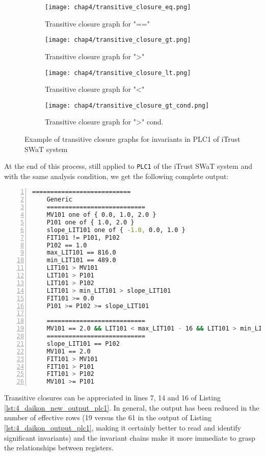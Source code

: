 \begin{figure}[H]
	\centering
	\begin{subfigure}{0.48\textwidth}
		\texttt{[image: chap4/transitive\_closure\_eq.png]}
		\caption{Transitive closure graph for "=="}
		\label{subfig:4_graph_eq}
	\end{subfigure}
	\hfill
	\begin{subfigure}{0.48\textwidth}
		\texttt{[image: chap4/transitive\_closure\_gt.png]}
		\caption{Transitive closure graph for ">"}
		\label{subfig:4_graph_gt}
	\end{subfigure}
	\begin{subfigure}{0.48\textwidth}
		\texttt{[image: chap4/transitive\_closure\_lt.png]}
		\caption{Transitive closure graph for "<"}
		\label{subfig:4_graph_lt}
	\end{subfigure}
	\hfill
	\begin{subfigure}{0.48\textwidth}
		\texttt{[image: chap4/transitive\_closure\_gt\_cond.png]}
		\caption{Transitive closure graph for ">" cond.}
		\label{subfig:4_graph_gt_cond}
	\end{subfigure}
	\caption{Example of transitive closure graphs for invariants in PLC1 of iTrust SWaT system}
	\label{fig:4_transitive_closure_graphs}
\end{figure}
At the end of this process, still applied to \texttt{PLC1} of the iTrust SWaT system and with the same analysis condition, we get the following complete output:

\begin{lstlisting}[language=bash,numbers=left,caption={Revised Daikon output with transitive closures for \texttt{PLC1} of the iTrust SWaT system},label=lst:4_daikon_new_output_plc1]
	===========================
	Generic
	===========================
	MV101 one of { 0.0, 1.0, 2.0 }
	P101 one of { 1.0, 2.0 }
	slope_LIT101 one of { -1.0, 0.0, 1.0 }
	FIT101 != P101, P102
	P102 == 1.0
	max_LIT101 == 816.0
	min_LIT101 == 489.0
	LIT101 > MV101
	LIT101 > P101
	LIT101 > P102
	LIT101 > min_LIT101 > slope_LIT101
	FIT101 >= 0.0
	P101 >= P102 >= slope_LIT101
	
	===========================
	MV101 == 2.0 && LIT101 < max_LIT101 - 16 && LIT101 > min_LIT101 + 15
	===========================
	slope_LIT101 == P102
	MV101 == 2.0
	FIT101 > MV101
	FIT101 > P101
	FIT101 > P102
	MV101 >= P101
\end{lstlisting}

\noindent Transitive closures can be appreciated in lines 7, 14 and 16 of Listing \ref{lst:4_daikon_new_output_plc1}.\newline
In general, the output has been reduced in the number of effective rows (19 versus the 61 in the output of Listing \ref{lst:4_daikon_output_plc1}, making it certainly better to read and identify significant invariants) and the invariant chains make it more immediate to grasp the relationships between registers.

